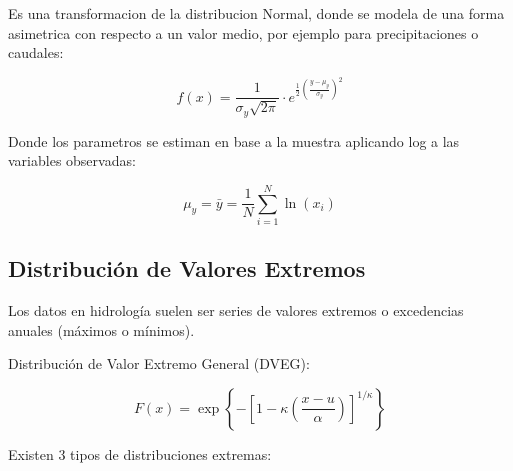 Es una transformacion de la distribucion Normal, donde se modela de una forma asimetrica con respecto a un valor medio, por ejemplo para precipitaciones o caudales:

\begin{equation}
    f(x) = \frac{1}{\sigma_y\sqrt{2\pi}} \cdot e^{\frac{1}{2}(\frac{y-\mu_y}{\sigma_y})^2}
\end{equation}

Donde los parametros se estiman en base a la muestra aplicando log a las variables observadas:

\begin{equation}
    \mu_y = \bar{y} = \frac{1}{N} \sum_{i=1}^{N} \ln(x_i)
\end{equation}

\subsection{Distribución de Valores Extremos}

Los datos en hidrología suelen ser series de valores extremos o excedencias anuales (máximos o mínimos).

Distribución de Valor Extremo General (DVEG):

\begin{equation}
    F(x) = \exp \left\{ - \left[ 1 - \kappa \left( \frac{x - u}{\alpha} \right) \right]^{1/\kappa} \right\}
\end{equation}

Existen 3 tipos de distribuciones extremas:

